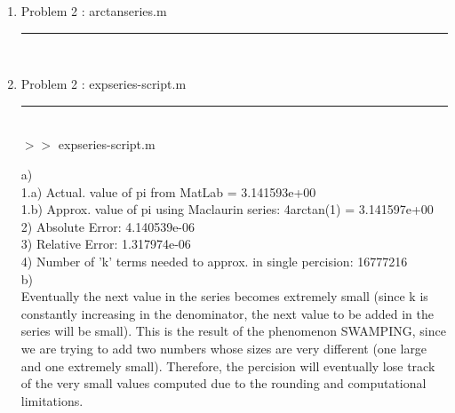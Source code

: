 \documentclass[12pt]{article}
\begin{document}
	\begin{enumerate}
	\item[] Problem 2 : arctanseries.m \noindent\rule{\textwidth}{1.0pt} \\
		
	
	\item[] Problem 2 : expseries-script.m \noindent\rule{\textwidth}{1.0pt} \\
		

	$>>$ expseries-script.m 
	\begin{framed}
a)\\
  \tabto{0.5cm}1.a) Actual. value of pi from MatLab = 3.141593e+00\\
   \tabto{0.5cm}1.b) Approx. value of pi using Maclaurin series: 4arctan(1) = 3.141597e+00\\
   \tabto{0.5cm}2) Absolute Error: 4.140539e-06\\
   \tabto{0.5cm}3) Relative Error: 1.317974e-06\\
   \tabto{0.5cm}4) Number of 'k' terms needed to approx. in single percision: 16777216\\
b)\\
   \tabto{0.5cm}Eventually the next value in the series becomes extremely small (since k is constantly increasing in the denominator, the next value to be added in the series will be small). This is the result of the phenomenon SWAMPING, since we are trying to add two numbers whose sizes are very different (one large and one extremely small). Therefore, the percision will eventually lose track of the very small values computed due to the rounding and computational limitations.	
	\end{framed}
	\end{enumerate}

	\pagebreak
\end{document}
